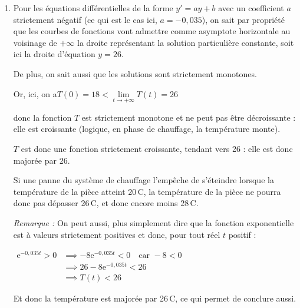 \documentclass[10pt]{article}
\providecommand{\e}{{\mathrm{e}}}
\begin{document}
\begin{enumerate}
			$\dfrac{\ln(0,75)}{-0,035} \approx 8,22$.

			Le temps est exprimé en dizaine de minutes. 8,22 dizaines de minutes, correspondent, à la minute près à 82 minutes, soit 1 heure et 22 minutes.

			À la minute près, il faut donc 1 heure et 22 minutes pour que la température atteigne les 20\,\textdegree{}C.

			\item Pour les équations différentielles de la forme \quad $y' = ay + b$ \quad avec un coefficient $a$ strictement négatif (ce qui est le cas ici, $a = -0,035$), on sait par propriété que les courbes de fonctions vont admettre comme asymptote horizontale au voisinage de $+\infty$ la droite représentant la solution particulière constante, soit ici la droite d'équation $y = 26$.

			De plus, on sait aussi que les solutions sont strictement monotones.

			Or, ici, on a\quad $T(0) = 18 < \lim\limits_{t \to +\infty}T(t) = 26$

			donc la fonction $T$ est strictement monotone et ne peut pas être décroissante : elle est croissante (logique, en phase de chauffage, la température monte).

			$T$ est donc une fonction strictement croissante, tendant vers 26 : elle est donc majorée par 26.

			Si une panne du système de chauffage l'empêche de s'éteindre lorsque la température de la pièce atteint 20\,\textdegree{}C, la température de la pièce ne pourra donc pas dépasser 26\,\textdegree{}C, et donc encore moins 28\,\textdegree{}C.

			\emph{Remarque :} On peut aussi, plus simplement dire que la fonction exponentielle est à valeurs strictement positives et donc, pour tout réel $t$ positif :

			$\begin{aligned}
				\e^{-0,035t} > 0
					&\implies -8\e^{-0,035t} < 0\quad \text{car } -8<0\\
					&\implies 26 -8\e^{-0,035t} < 26\\
					&\implies T(t) < 26
			\end{aligned}$

			Et donc la température est majorée par 26\,\textdegree{}C, ce qui permet de conclure aussi.
		\end{enumerate}
\end{document}
